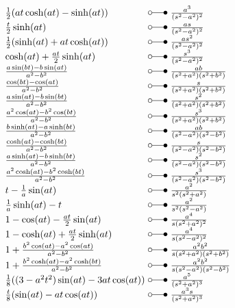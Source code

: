 \begin{footnotesize}
\[ \begin{array}{@{}l@{ ~ \laplace ~ }l@{}}
\frac{1}{2} (at \cosh(at) - \sinh(at)) &
    \frac{a^3}{(s^2 - a^2)^2} \\
\frac{t}{2} \sinh(at) &
    \frac{as}{(s^2 - a^2)^2} \\
\frac{1}{2} (\sinh(at) + at \cosh(at)) &
    \frac{a s^2}{(s^2 - a^2)^2} \\
\cosh(at) + \frac{at}{2} \sinh(at) &
    \frac{s^3}{(s^2 - a^2)^2} \\
\frac{a \sin(bt) - b \sin(at)}{a^2 - b^2} &
    \frac{ab}{(s^2 + a^2) (s^2 + b^2)} \\
\frac{\cos(bt) - \cos(at)}{a^2 - b^2} &
    \frac{s}{(s^2 + a^2) (s^2 + b^2)} \\
\frac{a \sin(at) - b \sin(bt)}{a^2 - b^2} &
    \frac{s^2}{(s^2 + a^2) (s^2 + b^2)} \\
\frac{a^2 \cos(at) - b^2 \cos(bt)}{a^2 - b^2} &
    \frac{s^3}{(s^2 + a^2) (s^2 + b^2)} \\
\frac{b \sinh(at) - a \sinh(bt)}{a^2 - b^2} &
    \frac{ab}{(s^2 - a^2) (s^2 - b^2)} \\
\frac{\cosh(at) - \cosh(bt)}{a^2 - b^2} &
    \frac{s}{(s^2 - a^2) (s^2 - b^2)} \\
\frac{a \sinh(at) - b \sinh(bt)}{a^2 - b^2} &
    \frac{s^2}{(s^2 - a^2) (s^2 - b^2)} \\
\frac{a^2 \cosh(at) - b^2 \cosh(bt)}{a^2 - b^2} &
    \frac{s^3}{(s^2 - a^2) (s^2 - b^2)} \\
t - \frac{1}{a} \sin(at) &
    \frac{a^2}{s^2 (s^2 + a^2)} \\
\frac{1}{a} \sinh(at) -t &
    \frac{a^2}{s^2(s^2 - a^2)} \\
1 - \cos(at) - \frac{at}{2} \sin(at) &
    \frac{a^4}{s (s^2 + a^2)^2} \\
1 - \cosh(at) + \frac{at}{2} \sinh(at) &
    \frac{a^4}{s (s^2 - a^2)^2} \\
1 + \frac{b^2 \cos(at) - a^2 \cos(at)}{a^2 - b^2} &
    \frac{a^2 b^2}{s (s^2 + a^2) (s^2 + b^2)} \\
1 + \frac{b^2 \cosh(at) - a^2 \cosh(bt)}{a^2 - b^2} &
    \frac{a^2 b^2}{s (s^2 - a^2) (s^2 - b^2)} \\
\frac{1}{8} ((3 - a^2 t^2) \sin(at) - 3 at \cos(at)) &
    \frac{a^5}{(s^2 + a^2)^3} \\
\frac{t}{8} (\sin(at) - at \cos(at)) &
    \frac{a^3 s}{(s^2 + a^2)^3} \\
\end{array} \]


\end{footnotesize}
